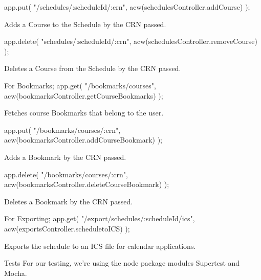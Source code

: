 \documentclass[12pt]{article}
\begin{document}
app.put(
     "/schedules/:scheduleId/:crn", 
     acw(schedulesController.addCourse)
);

	Adds a Course to the Schedule by the CRN passed.

app.delete(
     "schedules/:scheduleId/:crn", 
     acw(schedulesController.removeCourse)
);

Deletes a Course from the Schedule by the CRN passed.


	For Bookmarks;
app.get(
     "/bookmarks/courses", 
     acw(bookmarksController.getCourseBookmarks)
);

	Fetches course Bookmarks that belong to the user.

app.put(
     "/bookmarks/courses/:crn",
	acw(bookmarksController.addCourseBookmark)
);

	Adds a Bookmark by the CRN passed.
		
app.delete(
	"/bookmarks/courses/:crn",
     acw(bookmarksController.deleteCourseBookmark)
);

	Deletes a Bookmark by the CRN passed.

		For Exporting;
app.get(
	"/export/schedules/:scheduleId/ics",
     acw(exportsController.scheduletoICS)
);

	Exports the schedule to an ICS file for calendar applications.


Tests
	For our testing, we’re using the node package modules Supertest and Mocha.
\end{document}
